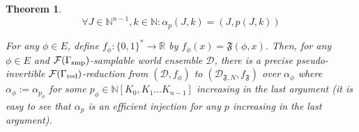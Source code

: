 \documentclass{article}
\numberwithin{equation}{section}
\theoremstyle{definition}
\theoremstyle{plain}
\newtheorem{theorem}{Theorem}[section]
\newcommand{\Bool}{\{0,1\}}
\newcommand{\Words}{{\Bool^*}}
\newcommand{\Nats}{\mathbb{N}}
\newcommand{\Reals}{\mathbb{R}}
\newcommand{\NatPoly}{\Nats[K_0, K_1 \ldots K_{n-1}]}
\newcommand{\Dist}{\mathcal{D}}
\newcommand{\Fall}{\mathcal{F}}
\begin{document}
\begin{samepage}
\begin{theorem}
\begin{equation}
\forall J \in \Nats^{n-1}, k \in \Nats: \alpha_p(J,k) = (J,p(J,k))
\end{equation}

For any ${\phi \in E}$, define ${f_\phi: \Words \rightarrow \Reals}$ by ${f_\phi(x)=\mathfrak{F}(\phi,x)}$. Then, for any ${\phi \in E}$ and ${\Fall(\Gamma_{\textnormal{smp}})}$-samplable world ensemble ${\Dist}$, there is a precise pseudo-invertible ${\Fall(\Gamma_{\textnormal{red}})}$-reduction from ${(\Dist,f_\phi)}$ to ${(\Dist_{\mathfrak{F},N}, f_{\mathfrak{F}})}$ over ${\alpha_{\phi}}$ where ${\alpha_\phi:=\alpha_{p_\phi}}$ for some ${p_\phi \in \NatPoly}$ increasing in the last argument (it is easy to see that ${\alpha_p}$ is an efficient injection for any ${p}$ increasing in the last argument).

\end{theorem}
\end{samepage}
\end{document}
